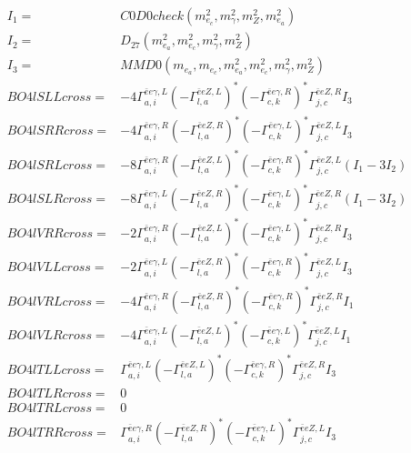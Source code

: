 \documentclass[A4,landscape]{article}
\begin{document}
\begin{align} 
I_1 = & C0D0check(m^2_{e_{{c}}}, m^2_{\gamma}, m^2_{Z}, m^2_{e_{{a}}}) \\ 
I_2 = & D_{27}(m^2_{e_{{a}}}, m^2_{e_{{c}}}, m^2_{\gamma}, m^2_{Z}) \\ 
I_3 = & MMD0(m_{e_{{a}}}, m_{e_{{c}}}, m^2_{e_{{a}}}, m^2_{e_{{c}}}, m^2_{\gamma}, m^2_{Z}) \\ 
  BO4lSLLcross= & -4  \Gamma^{\bar{e}e \gamma ,L}_{a, i} (- \Gamma^{\bar{e}e Z ,L} _{l, a})^* (- \Gamma^{\bar{e}e \gamma ,R} _{c, k})^* \Gamma^{\bar{e}e Z ,R}_{j, c} I_3 \\ 
  BO4lSRRcross= & -4  \Gamma^{\bar{e}e \gamma ,R}_{a, i} (- \Gamma^{\bar{e}e Z ,R} _{l, a})^* (- \Gamma^{\bar{e}e \gamma ,L} _{c, k})^* \Gamma^{\bar{e}e Z ,L}_{j, c} I_3 \\ 
  BO4lSRLcross= & -8  \Gamma^{\bar{e}e \gamma ,R}_{a, i} (- \Gamma^{\bar{e}e Z ,L} _{l, a})^* (- \Gamma^{\bar{e}e \gamma ,R} _{c, k})^* \Gamma^{\bar{e}e Z ,L}_{j, c} (I_1 - 3 I_2) \\ 
  BO4lSLRcross= & -8  \Gamma^{\bar{e}e \gamma ,L}_{a, i} (- \Gamma^{\bar{e}e Z ,R} _{l, a})^* (- \Gamma^{\bar{e}e \gamma ,L} _{c, k})^* \Gamma^{\bar{e}e Z ,R}_{j, c} (I_1 - 3 I_2) \\ 
  BO4lVRRcross= & -2  \Gamma^{\bar{e}e \gamma ,R}_{a, i} (- \Gamma^{\bar{e}e Z ,L} _{l, a})^* (- \Gamma^{\bar{e}e \gamma ,L} _{c, k})^* \Gamma^{\bar{e}e Z ,R}_{j, c} I_3 \\ 
  BO4lVLLcross= & -2  \Gamma^{\bar{e}e \gamma ,L}_{a, i} (- \Gamma^{\bar{e}e Z ,R} _{l, a})^* (- \Gamma^{\bar{e}e \gamma ,R} _{c, k})^* \Gamma^{\bar{e}e Z ,L}_{j, c} I_3 \\ 
  BO4lVRLcross= & -4  \Gamma^{\bar{e}e \gamma ,R}_{a, i} (- \Gamma^{\bar{e}e Z ,R} _{l, a})^* (- \Gamma^{\bar{e}e \gamma ,R} _{c, k})^* \Gamma^{\bar{e}e Z ,R}_{j, c} I_1 \\ 
  BO4lVLRcross= & -4  \Gamma^{\bar{e}e \gamma ,L}_{a, i} (- \Gamma^{\bar{e}e Z ,L} _{l, a})^* (- \Gamma^{\bar{e}e \gamma ,L} _{c, k})^* \Gamma^{\bar{e}e Z ,L}_{j, c} I_1 \\ 
  BO4lTLLcross= &  \Gamma^{\bar{e}e \gamma ,L}_{a, i} (- \Gamma^{\bar{e}e Z ,L} _{l, a})^* (- \Gamma^{\bar{e}e \gamma ,R} _{c, k})^* \Gamma^{\bar{e}e Z ,R}_{j, c} I_3 \\ 
  BO4lTLRcross= & 0 \\ 
  BO4lTRLcross= & 0 \\ 
  BO4lTRRcross= &  \Gamma^{\bar{e}e \gamma ,R}_{a, i} (- \Gamma^{\bar{e}e Z ,R} _{l, a})^* (- \Gamma^{\bar{e}e \gamma ,L} _{c, k})^* \Gamma^{\bar{e}e Z ,L}_{j, c} I_3 \\ 
\end{align} 
\end{document}
